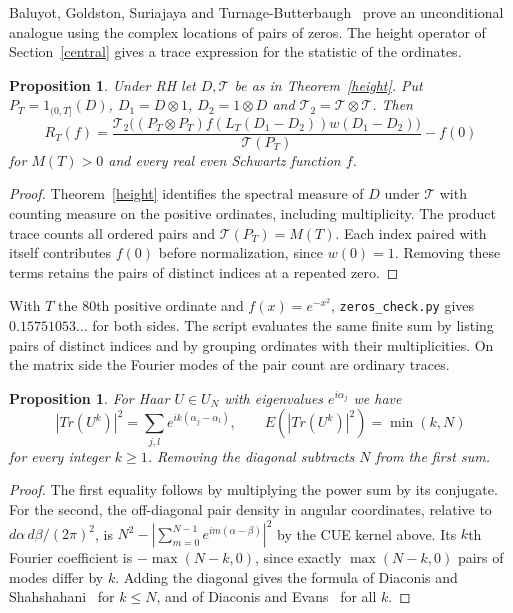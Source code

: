 \documentclass[11pt,a4paper]{article}
\newtheorem{prop}[thm]{Proposition}
\begin{document}
Baluyot, Goldston, Suriajaya and Turnage-Butterbaugh~\cite{bgst} prove an unconditional analogue using the complex locations of pairs of zeros. The height operator of Section~\ref{central} gives a trace expression for the statistic of the ordinates.

\begin{samepage}
\begin{prop}
Under RH let $D,\mathcal T$ be as in Theorem~\textup{\ref{height}}. Put $P_T=1_{(0,T]}(D)$, $D_1=D\otimes1$, $D_2=1\otimes D$ and $\mathcal T_2=\mathcal T\otimes\mathcal T$. Then
\[
 R_T(f)=\frac{\mathcal T_2\big((P_T\otimes P_T)
 f(L_T(D_1-D_2))w(D_1-D_2)\big)}{\mathcal T(P_T)}-f(0)
\]
for $M(T)>0$ and every real even Schwartz function $f$.
\end{prop}
\end{samepage}
\begin{proof}
Theorem~\ref{height} identifies the spectral measure of $D$ under $\mathcal T$ with counting measure on the positive ordinates, including multiplicity. The product trace counts all ordered pairs and $\mathcal T(P_T)=M(T)$. Each index paired with itself contributes $f(0)$ before normalization, since $w(0)=1$. Removing these terms retains the pairs of distinct indices at a repeated zero.
\end{proof}

With $T$ the $80$th positive ordinate and $f(x)=e^{-x^2}$, \texttt{zeros\_check.py} gives $0.15751053\ldots$ for both sides. The script evaluates the same finite sum by listing pairs of distinct indices and by grouping ordinates with their multiplicities. On the matrix side the Fourier modes of the pair count are ordinary traces.

\begin{samepage}
\begin{prop}\label{classical-powers}
For Haar $U\in U_N$ with eigenvalues $e^{i\alpha_j}$ we have
\[
 |Tr(U^k)|^2=\sum_{j,l}e^{ik(\alpha_j-\alpha_l)},\qquad
 E(|Tr(U^k)|^2)=\min(k,N)
\]
for every integer $k\geq1$. Removing the diagonal subtracts $N$ from the first sum.
\end{prop}
\end{samepage}
\begin{proof}
The first equality follows by multiplying the power sum by its conjugate. For the second, the off-diagonal pair density in angular coordinates, relative to $d\alpha\,d\beta/(2\pi)^2$, is $N^2-|\sum_{m=0}^{N-1}e^{im(\alpha-\beta)}|^2$ by the CUE kernel above. Its $k$th Fourier coefficient is $-\max(N-k,0)$, since exactly $\max(N-k,0)$ pairs of modes differ by $k$. Adding the diagonal gives the formula of Diaconis and Shahshahani~\cite{ds} for $k\leq N$, and of Diaconis and Evans~\cite{de} for all $k$.
\end{proof}
\end{document}
